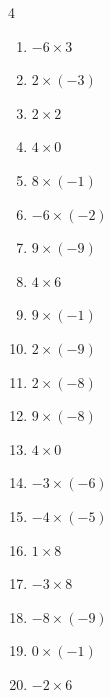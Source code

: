 \begin{multicols}{4}
\begin{enumerate}
  \item $-6\times 3$
        \phantom{$=-18$}

  \item $2\times (-3)$
        \phantom{$=-6$}

  \item $2\times 2$
        \phantom{$=4$}

  \item $4\times 0$
        \phantom{$=0$}

  \item $8\times (-1)$
        \phantom{$=-8$}

  \item $-6\times (-2)$
        \phantom{$=12$}

  \item $9\times (-9)$
        \phantom{$=-81$}

  \item $4\times 6$
        \phantom{$=24$}

  \item $9\times (-1)$
        \phantom{$=-9$}

  \item $2\times (-9)$
        \phantom{$=-18$}

  \item $2\times (-8)$
        \phantom{$=-16$}

  \item $9\times (-8)$
        \phantom{$=-72$}

  \item $4\times 0$
        \phantom{$=0$}

  \item $-3\times (-6)$
        \phantom{$=18$}

  \item $-4\times (-5)$
        \phantom{$=20$}

  \item $1\times 8$
        \phantom{$=8$}

\columnbreak %

  \item $-3\times 8$
        \phantom{$=-24$}

  \item $-8\times (-9)$
        \phantom{$=72$}

  \item $0\times (-1)$
        \phantom{$=0$}

  \item $-2\times 6$
        \phantom{$=-12$}


\end{enumerate}
\end{multicols}
